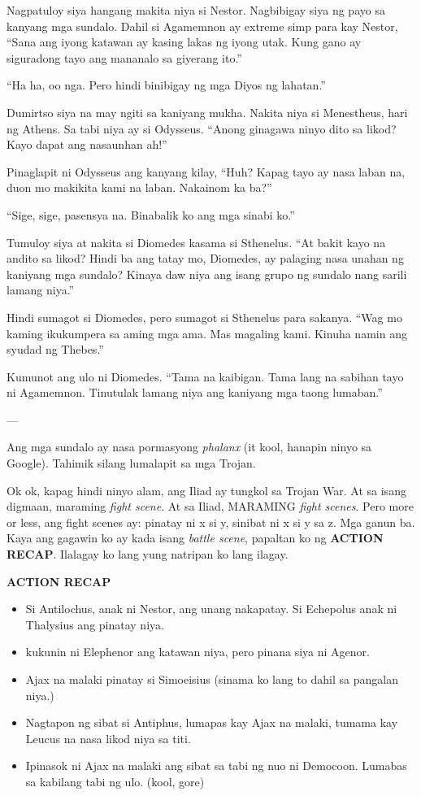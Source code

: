 \documentclass[12pt,letterpaper]{report}
\newenvironment{recap}{\begin{samepage}\begin{center}{\large\textbf{ACTION RECAP}}\begin{itemize}}{\end{itemize}\end{center}\end{samepage}}
\begin{document}
Nagpatuloy siya hangang makita niya si Nestor. Nagbibigay siya ng payo sa kanyang mga sundalo. Dahil si Agamemnon ay extreme simp para kay Nestor, ``Sana ang iyong katawan ay kasing lakas ng iyong utak. Kung gano ay siguradong tayo ang mananalo sa giyerang ito.''

``Ha ha, oo nga. Pero hindi binibigay ng mga Diyos ng lahatan.''

Dumirtso siya na may ngiti sa kaniyang mukha. Nakita niya si Menestheus, hari ng Athens. Sa tabi niya ay si Odysseus. ``Anong ginagawa ninyo dito sa likod? Kayo dapat ang nasaunhan ah!''

Pinaglapit ni Odysseus ang kanyang kilay, ``Huh? Kapag tayo ay nasa laban na, duon mo makikita kami na laban. Nakainom ka ba?''

``Sige, sige, pasensya na. Binabalik ko ang mga sinabi ko.''

Tumuloy siya at nakita si Diomedes kasama si Sthenelus. ``At bakit kayo na andito sa likod? Hindi ba ang tatay mo, Diomedes, ay palaging nasa unahan ng kaniyang mga sundalo? Kinaya daw niya ang isang grupo ng sundalo nang sarili lamang niya.''

Hindi sumagot si Diomedes, pero sumagot si Sthenelus para sakanya. ``Wag mo kaming ikukumpera sa aming mga ama. Mas magaling kami. Kinuha namin ang syudad ng Thebes.''

Kumunot ang ulo ni Diomedes. ``Tama na kaibigan. Tama lang na sabihan tayo ni Agamemnon. Tinutulak lamang niya ang kaniyang mga taong lumaban.''

---

Ang mga sundalo ay nasa pormasyong \textit{phalanx} (it kool, hanapin ninyo sa Google). Tahimik silang lumalapit sa mga Trojan.

Ok ok, kapag hindi ninyo alam, ang Iliad ay tungkol sa Trojan War. At sa isang digmaan, maraming \textit{fight scene}. At sa Iliad, MARAMING \textit{fight scenes}. Pero more or less, ang fight scenes ay: pinatay ni x si y, sinibat ni x si y sa z. Mga ganun ba. Kaya ang gagawin ko ay kada isang \textit{battle scene}, papaltan ko ng \textbf{ACTION RECAP}. Ilalagay ko lang yung natripan ko lang ilagay.

\begin{recap}
    \item Si Antilochus, anak ni Nestor, ang unang nakapatay. Si Echepolus anak ni Thalysius ang pinatay niya.
    \item kukunin ni Elephenor ang katawan niya, pero pinana siya ni Agenor.
    \item Ajax na malaki pinatay si Simoeisius (sinama ko lang to dahil sa pangalan niya.)
    \item Nagtapon ng sibat si Antiphus, lumapas kay Ajax na malaki, tumama kay Leucus na nasa likod niya sa titi.
    \item Ipinasok ni Ajax na malaki ang sibat sa tabi ng nuo ni Democoon. Lumabas sa kabilang tabi ng ulo. (kool, gore)
\end{recap}
\end{document}
